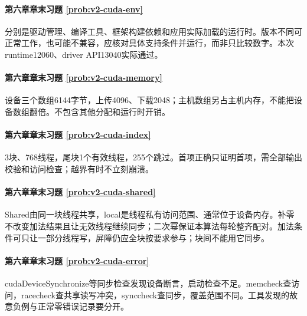 \paragraph*{第六章章末习题 \ref{prob:v2-cuda-env}}
\begin{solution}
分别是驱动管理、编译工具、框架构建依赖和应用实际加载的运行时。版本不同可正常工作，也可能不兼容，应核对具体支持条件并运行，而非只比较数字。本次runtime12060、driver API13040实际通过。
\end{solution}

\paragraph*{第六章章末习题 \ref{prob:v2-cuda-memory}}
\begin{solution}
设备三个数组6144字节，上传4096、下载2048；主机数组另占主机内存，不能把设备数组翻倍。不包含其他分配和运行时开销。
\end{solution}

\paragraph*{第六章章末习题 \ref{prob:v2-cuda-index}}
\begin{solution}
3块、768线程，尾块1个有效线程，255个跳过。首项正确只证明首项，需全部输出校验和访问检查；越界有时不立刻崩溃。
\end{solution}

\paragraph*{第六章章末习题 \ref{prob:v2-cuda-shared}}
\begin{solution}
Shared由同一块线程共享，local是线程私有访问范围、通常位于设备内存。补零不改变加法结果且让无效线程继续同步；二次幂保证本算法每轮整齐配对。加法条件可只让一部分线程写，屏障仍应全块按要求参与；块间不能用它同步。
\end{solution}

\paragraph*{第六章章末习题 \ref{prob:v2-cuda-error}}
\begin{solution}
cudaDeviceSynchronize等同步检查发现设备断言，启动检查不足。memcheck查访问，racecheck查共享读写冲突，synccheck查同步，覆盖范围不同。工具发现的故意负例与正常零错误记录要分开。
\end{solution}

